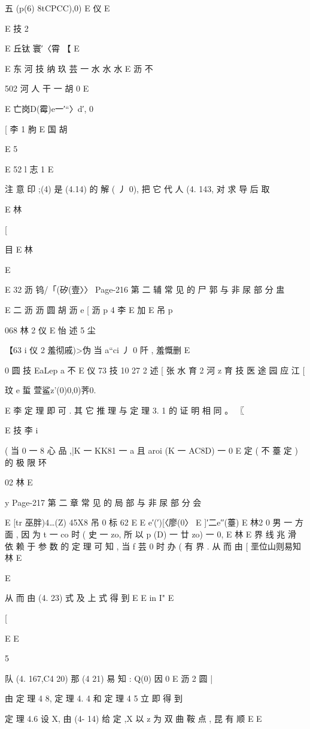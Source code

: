 {{{{{{{{{{{{五 (p(6) 8tCPCC),0)
E 仪
E

E 技 2

E 丘钛 寰′〈霄 【 E

E 东 河 技 纳 玖 芸 一 水 水 水
E 沥 不

502 河 人 干 一 胡 0
E

E 亡岗D(霉)e一′“〉d′, 0

[ 李 1 朐
E 国 胡

E
5

E
52
l 志 1
E

注 意 印 ;(4) 是 (4.14) 的 解 ( 丿 0), 把 它 代 人 (4. 143, 对 求 导 后 取

E
林

[

目
E 林

E

E 32 沥 钨/「(矽(壹〉〉
Page-216
第 二 辅 常 见 的 尸 郭 与 非 尿 部 分 盅

E 二 沥 沥 圆 胡 沥
e
[ 沥 p 4 李
E 加
E 吊 p

068 林 2 仪
E 怡 述
5 尘

【63 i 仪 2 羞彻戚)>伪 当 a“ci 丿 0 阡 , 羞慨删
E

0 圆 技
EaLep a 不
E 仪 73 技 10 27 2 述
[ 张 水 育 2 河 z 育 技
医 途 园 应 江 [

玟
e
蜇 萱鲨z'(0)0,0)荠0.

E 李
定 理 即 可 . 其 它 推 理 与 定 理 3. 1 的 证 明 相 同 。 〖

E 技 李
i

( 当 0 一 8 心 品 ,|K 一 KK81 一 a 且 aroi (K 一 AC8D) 一 0
E
定 ( 不 薹 定 ) 的 极 限 环

02 林
E

y
Page-217
第 二 章 常 见 的 局 部 与 非 尿 部 分 会

E [tr 巫胖)4…(Z) 45X8 吊 0 标 62
E
E e′(′)[〈廖(0〉 E ]′二e′′(薹) E 林2
0
男 一 方 面 , 因 为 t 一 co 时 ( 史 一 zo, 所 以 p (D) 一 廿 zo) 一 0,
E 林
E
界 线 兆 滑 依 赖 于 参 数 的 定 理 可 知 , 当 f 芸 0 时 办 ( 有 界 . 从 而 由
[ 垩位山则易知
林
E

E

从 而 由 (4. 23) 式 及 上 式 得 到
E
E in I" E

[

E E

5

队 (4. 167,C4 20) 那 (4 21) 易 知 : Q(0) 因 0
E 沥 2 圆 |

由 定 理 4 8, 定 理 4. 4 和 定 理 4 5 立 即 得 到

定 理 4.6 设 X, 由 (4- 14) 给 定 ,X 以 z 为 双 曲 鞍 点 , 昆 有 顺
E
E

}}}}}}}}}}}}
